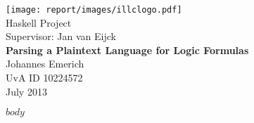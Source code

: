 \documentclass[a4paper,11pt,titlepage]{article}
\makeatletter
\def\maxwidth{\ifdim\Gin@nat@width>\linewidth\linewidth
\else\Gin@nat@width\fi}
\let\Oldincludegraphics\includegraphics
\renewcommand{\includegraphics}[1]{\Oldincludegraphics[width=\maxwidth]{#1}}
\makeatother
\begin{document}

\begin{titlepage}
  \begin{center}
    \vspace*{10ex}
    \texttt{[image: report/images/illclogo.pdf]}\\
    \vspace*{10ex}
    {Haskell Project}\\
    \small{Supervisor: Jan van Eijck}\\
    \vspace*{5ex}
    \textbf{\color{sdbase03} \Large Parsing a Plaintext Language for Logic Formulas}\\
    \vspace*{5ex}
    {Johannes Emerich}\\
    {UvA ID 10224572}\\
    \vspace*{20ex}
    \small{July 2013}\\
  \end{center}
\end{titlepage}

\tableofcontents

$body$

%
%
\end{document}
